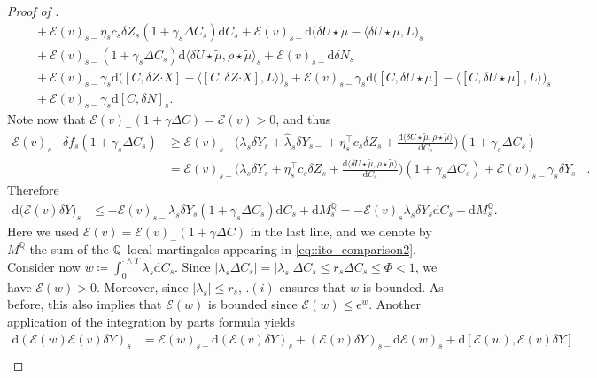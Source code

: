 \documentclass[10pt]{article} %
\newcommand\cE{\mathcal E}
\def \Q{\mathbb{Q}}
\newcommand{\bcdot}{\boldsymbol{\cdot}}
\newcommand{\1}{\mathbf{1}}
\def\d{\mathrm{d}}
\begin{document}
\begin{proof}[Proof of ]
\begin{align}
		&\quad + \cE(v)_{s-} \eta_s c_s\delta Z_s (1+\gamma_s\Delta C_s) \d C_s + \cE(v)_{s-}\d\big(\delta U \star \tilde\mu - \langle \delta U \star\tilde\mu,L\big)_s \nonumber\\
		&\quad + \cE(v)_{s-}(1+\gamma_s \Delta C_s)\d \langle \delta U \star\tilde\mu,\rho\star\tilde\mu\rangle_s  + \cE(v)_{s-}\d \delta N_s \nonumber\\
		&\quad + \cE(v)_{s-}\gamma_s \d\big([C,\delta Z \bcdot X]-\big\langle [C,\delta Z \bcdot X],L \big\rangle\big)_s + \cE(v)_{s-}\gamma_s \d\big([C,\delta U \star\tilde\mu]-\big\langle [C,\delta U \star\tilde\mu],L \big\rangle\big)_s \nonumber\\
		&\quad + \cE(v)_{s-}\gamma_s \d [C,\delta N]_s.
	\end{align}
	Note now that $\cE(v)_{-}(1+\gamma\Delta C) = \cE(v) > 0$, and thus
	\begin{align*}
		\cE(v)_{s-}\delta f_s(1+\gamma_s\Delta C_s) 
		&\geq \cE(v)_{s-}\bigg(\lambda_s\delta Y_s + \widehat\lambda_s\delta Y_{s-} + \eta^\top_s c_s \delta Z_s + \frac{\d\langle \delta U \star\tilde\mu, \rho\star\tilde\mu\rangle}{\d C_s}\bigg)(1+\gamma_s\Delta C_s) \\
		&= \cE(v)_{s-}\bigg(\lambda_s\delta Y_s + \eta^\top_s c_s \delta Z_s + \frac{\d\langle \delta U \star\tilde\mu, \rho\star\tilde\mu\rangle}{\d C_s}\bigg)(1+\gamma_s\Delta C_s) + \cE(v)_{s-}\gamma_s\delta Y_{s-}.
	\end{align*}
	Therefore
	\begin{align*}
		\d \big(\cE(v)\delta Y\big)_s 
		& \leq - \cE(v)_{s-}\lambda_s \delta Y_s (1+\gamma_s\Delta C_s) \d C_s + \d M^\Q_s  = - \cE(v)_s\lambda_s \delta Y_s \d C_s + \d M^\Q_s.
	\end{align*}
	Here we used $\cE(v) = \cE(v)_-(1+\gamma\Delta C)$ in the last line, and we denote by $M^\Q$ the sum of the $\Q$--local martingales appearing in \eqref{eq::ito_comparison2}. Consider now $w \coloneqq \int_0^{\cdot \land T} \lambda_s \d C_s$. Since $|\lambda_s \Delta C_s| = |\lambda_s|\Delta C_s \leq r_s \Delta C_s \leq \Phi < 1$, we have $\cE(w) > 0$. Moreover, since $|\lambda_s| \leq r_s$, .$(i)$ ensures that $w$ is bounded. As before, this also implies that $\cE(w)$ is bounded since $\cE(w)\leq\mathrm{e}^w$. Another application of the integration by parts formula yields
	\begin{align*}
		\d (\cE(w)\cE(v)\delta Y)_s 
		&= \cE(w)_{s-}\d (\cE(v)\delta Y)_s + (\cE(v)\delta Y)_{s-}\d \cE(w)_s + \d [\cE(w),\cE(v)\delta Y] \\

\end{align*}
\end{proof}
\end{document}
